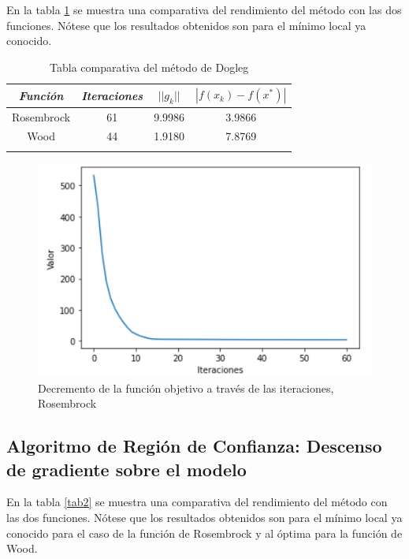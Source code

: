 \documentclass[conference]{IEEEtran}
\begin{document}
En la tabla \ref{tab1} se muestra una comparativa del rendimiento del método con las dos funciones.
Nótese que los resultados obtenidos son para el mínimo local ya conocido.

\begin{table}[htbp]
    \caption{Tabla comparativa del método de Dogleg}
    \begin{center}
        \begin{tabular}{|c|c|c|c|}
            \hline
			\textbf{\textit{Función}}& \textbf{\textit{Iteraciones}}& \textbf{\textit{$||g_k||$}}& \textbf{\textit{$|f(x_k) - f(x^*)|$}} \\

            \hline
            Rosembrock& 61 & 9.9986 & 3.9866 \\
            Wood& 44 & 1.9180 & 7.8769 \\
            \hline
            \multicolumn{4}{l}{}
        \end{tabular}
        \label{tab1}
    \end{center}
\end{table}

\begin{figure}[htbp]
    \centerline{\includegraphics[scale=0.4]{e1-1.png}}
    \caption{Decremento de la función objetivo a través de las iteraciones, Rosembrock}
    \label{img-e1-1}
\end{figure}

\subsection{Algoritmo de Región de Confianza: Descenso de gradiente sobre el modelo}

En la tabla \ref{tab2} se muestra una comparativa del rendimiento del método con las dos funciones.
Nótese que los resultados obtenidos son para el mínimo local ya conocido para el caso de la función
de Rosembrock y al óptima para la función de Wood.
\end{document}
